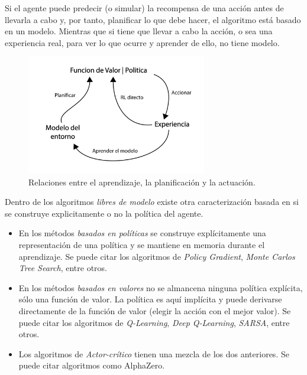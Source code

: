 Si el agente puede predecir (o simular) la recompensa de una acción antes de llevarla a cabo y, por tanto, planificar lo que debe hacer, el algoritmo está basado en un modelo. Mientras que si tiene que llevar a cabo la acción, o sea una experiencia real, para ver lo que ocurre y aprender de ello, no tiene modelo.

\begin{figure}[ht!]
    \centering
    \includegraphics[width=0.7\textwidth]{Graphics/rl-strategies.png}
    \caption{Relaciones entre el aprendizaje, la planificación y la actuación.}
    \label{fig:rl-strategies}
\end{figure}


Dentro de los algoritmos  \textit{libres de modelo} existe otra caracterización basada en si se construye explicitamente o no la política del agente.

\begin{itemize}
\item En los métodos \textit{basados en políticas} se construye explícitamente una representación de una política y se mantiene en memoria durante el aprendizaje. Se puede citar los algoritmos de \textit{Policy Gradient}, \textit{Monte Carlos Tree Search}, entre otros.

\item En los métodos \textit{basados en valores} no se almancena ninguna política explícita, sólo una función de valor. La política es aquí implícita y puede derivarse directamente de la función de valor (elegir la acción con el mejor valor). Se puede citar los algoritmos de \textit{Q-Learning}, \textit{Deep Q-Learning}, \textit{SARSA}, entre otros.

\item Los algoritmos de \textit{Actor-crítico} tienen una mezcla de los dos anteriores. Se puede citar algoritmos como AlphaZero.
\end{itemize}

